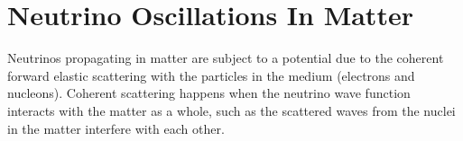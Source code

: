 %
%
%
%



\section{Neutrino Oscillations In Matter}
\label{sec:neutrino_oscillations_matter}


Neutrinos propagating in matter are subject to a potential due to the coherent forward elastic scattering with the particles in the medium (electrons and nucleons). Coherent scattering happens when the neutrino wave function interacts with the matter as a whole, such as the scattered waves from the nuclei in the matter interfere with each other.


